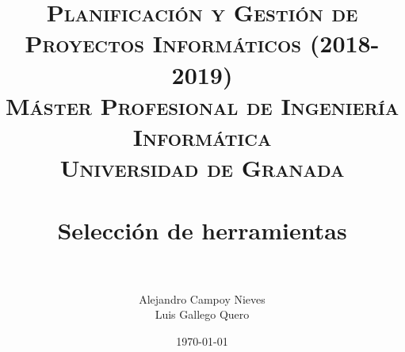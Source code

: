 

\title{	
	\normalfont \normalsize 
	\textsc{\textbf{Planificación y Gestión de Proyectos Informáticos (2018-2019)} \\ Máster Profesional de Ingeniería Informática \\ Universidad de Granada} \\ [25pt] %
	\horrule{0.5pt} \\[0.4cm] %
	\huge Selección de herramientas \\ %
	\horrule{2pt} \\[0.5cm] %
}

\author{Alejandro Campoy Nieves \\ Luis Gallego Quero} %
\date{\normalsize\today} %

\usepackage[spanish, es-tabla]{babel}
\usepackage{hyperref} %
\hypersetup{
	colorlinks=true,
	linkcolor=blue,
	filecolor=magenta,      
	urlcolor=blue,
}
\usepackage{graphicx}
\usepackage{amssymb, amsmath, amsbsy}
\usepackage{mathptmx}	
\usepackage{float}
\usepackage{booktabs}					%
\usepackage{eurosym}

\usepackage[table]{xcolor}
\usepackage{color}
\usepackage{colortbl}
\usepackage{multicol}
\usepackage{multirow}
\usepackage{booktabs}
\usepackage{tabularx}
\usepackage{array}
\usepackage{caption}
\usepackage{subcaption}




	\maketitle %
	
	\newpage %
	
	\tableofcontents %
	
	
